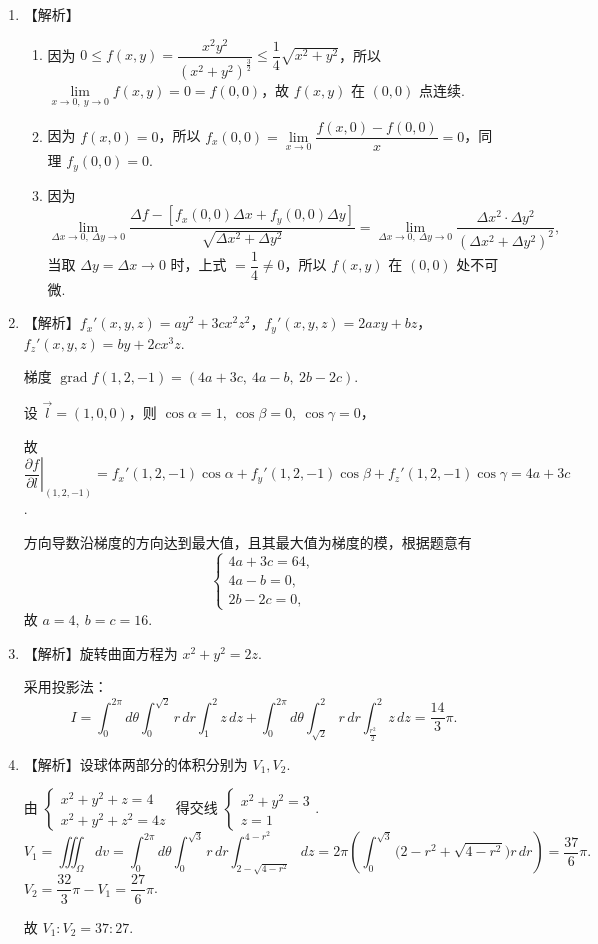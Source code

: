 \documentclass[a4paper,11pt]{ctexart}
\newcommand{\grad}{\operatorname{grad}}
\begin{document}
\begin{enumerate}[label=\arabic*、, leftmargin=2.2em, itemsep=0.9em, topsep=0.6em]
  \item 【解析】
  \begin{enumerate}[label=(\arabic*), leftmargin=2em, itemsep=0.4em, topsep=0.3em]
    \item 因为 $0 \le f(x,y) = \dfrac{x^2 y^2}{(x^2+y^2)^{\frac{3}{2}}} \le \dfrac{1}{4}\sqrt{x^2+y^2}$，所以 $\lim\limits_{x\to 0,\ y\to 0} f(x,y) = 0 = f(0,0)$，故 $f(x,y)$ 在 $(0,0)$ 点连续.
    \item 因为 $f(x,0) = 0$，所以 $f_x(0,0) = \lim\limits_{x\to 0}\dfrac{f(x,0) - f(0,0)}{x} = 0$，同理 $f_y(0,0) = 0$.
    \item 因为
    \[
      \lim_{\Delta x\to 0,\ \Delta y\to 0} \frac{\Delta f - [f_x(0,0)\Delta x + f_y(0,0)\Delta y]}{\sqrt{\Delta x^2 + \Delta y^2}} = \lim_{\Delta x\to 0,\ \Delta y\to 0} \frac{\Delta x^2 \cdot \Delta y^2}{(\Delta x^2 + \Delta y^2)^2},
    \]
    当取 $\Delta y = \Delta x \to 0$ 时，上式 $= \dfrac{1}{4} \neq 0$，所以 $f(x,y)$ 在 $(0,0)$ 处不可微.
  \end{enumerate}

  \item 【解析】$f_x'(x,y,z) = ay^2 + 3cx^2z^2$，$f_y'(x,y,z) = 2axy + bz$，$f_z'(x,y,z) = by + 2cx^3z$.

  梯度 $\grad f(1,2,-1) = (4a + 3c,\ 4a - b,\ 2b - 2c)$.

  设 $\vec{l} = (1,0,0)$，则 $\cos\alpha = 1,\ \cos\beta = 0,\ \cos\gamma = 0$，

  故 $\left.\dfrac{\partial f}{\partial l}\right|_{(1,2,-1)} = f_x'(1,2,-1)\cos\alpha + f_y'(1,2,-1)\cos\beta + f_z'(1,2,-1)\cos\gamma = 4a + 3c$.

  方向导数沿梯度的方向达到最大值，且其最大值为梯度的模，根据题意有
  \[
    \begin{cases}
      4a + 3c = 64, \\
      4a - b = 0, \\
      2b - 2c = 0,
    \end{cases}
  \]
  故 $a = 4,\ b = c = 16$.

  \item 【解析】旋转曲面方程为 $x^2 + y^2 = 2z$.

  采用投影法：
  \[
    I = \int_0^{2\pi} d\theta \int_0^{\sqrt{2}} r\,dr \int_1^2 z\,dz + \int_0^{2\pi} d\theta \int_{\sqrt{2}}^2 r\,dr \int_{\frac{r^2}{2}}^2 z\,dz = \frac{14}{3}\pi.
  \]

  \item 【解析】设球体两部分的体积分别为 $V_1, V_2$.

  由 $\begin{cases} x^2 + y^2 + z = 4 \\ x^2 + y^2 + z^2 = 4z \end{cases}$ 得交线 $\begin{cases} x^2 + y^2 = 3 \\ z = 1 \end{cases}$.
  \[
    V_1 = \iiint_\Omega dv = \int_0^{2\pi} d\theta \int_0^{\sqrt{3}} r\,dr \int_{2-\sqrt{4-r^2}}^{4-r^2} dz = 2\pi \left(\int_0^{\sqrt{3}} \big(2 - r^2 + \sqrt{4-r^2}\big)r\,dr\right) = \frac{37}{6}\pi.
  \]
  $V_2 = \dfrac{32}{3}\pi - V_1 = \dfrac{27}{6}\pi$.

  故 $V_1 : V_2 = 37 : 27$.
\end{enumerate}
\end{document}
